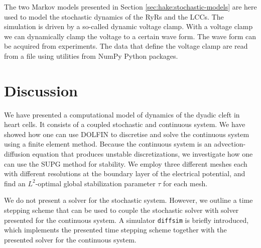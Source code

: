 The two Markov models presented in Section
\ref{sec:hake:stochastic-models} are here used to model the stochastic
dynamics of the RyRs and the LCCs. The simulation is driven by a
so-called dynamic voltage clamp. With a voltage clamp we can
dynamically clamp the voltage to a certain wave form. The wave form
can be acquired from experiments. The data that define the voltage
clamp are read from a file using utilities from NumPy Python packages.

\section{Discussion}

We have presented a computational model of \Ca dynamics of the dyadic
cleft in heart cells. It consists of a coupled stochastic and
continuous system. We have showed how one can use DOLFIN to discretise
and solve the continuous system using a finite element method. Because
the continuous system is an advection-diffusion equation that produces
unstable discretizations, we investigate how one can use the SUPG
method for stability. We employ three different meshes each with
different resolutions at the boundary layer of the electrical
potential, and find an $L^2$-optimal global stabilization parameter
$\tau$ for each mesh.

We do not present a solver for the stochastic system. However, we
outline a time stepping scheme that can be used to couple the
stochastic solver with solver presented for the continuous system. A
simulator \texttt{diffsim} is briefly introduced, which implements the
presented time stepping scheme together with the presented solver for
the continuous system.
